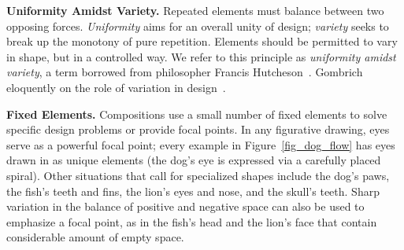 \begin{items}
\item \textbf{Uniformity Amidst Variety.} Repeated elements must balance
  between two opposing forces.  \textit{Uniformity} 
  aims for an overall unity of design; \textit{variety}
  seeks to break up the monotony of
  pure repetition.  Elements should be permitted to vary in shape,
  but in a controlled way.  We refer to this principle
  as \textit{uniformity amidst variety}, a term borrowed from 
  philosopher Francis Hutcheson~\cite{Hutcheson1729}.
  Gombrich  eloquently on the role of variation in 
  design~\cite{Gombrich}.

\item \textbf{Fixed Elements.} Compositions use a small number of fixed
  elements to solve specific design problems or provide focal points.
  In any figurative drawing, eyes serve as a powerful focal point;
  every example in Figure~\ref{fig_dog_flow} has eyes drawn
  in as unique elements
  (the dog's eye is expressed via a carefully placed spiral).  Other
  situations that call for specialized shapes include the dog's paws,
  the fish's teeth and fins, 
  the lion's eyes and nose, %
  and the skull's teeth.
  Sharp variation in the balance of positive and negative space
  can also be used to emphasize a focal point,
  as in the fish's head and the lion's face that contain considerable amount of empty space.


\end{items}
